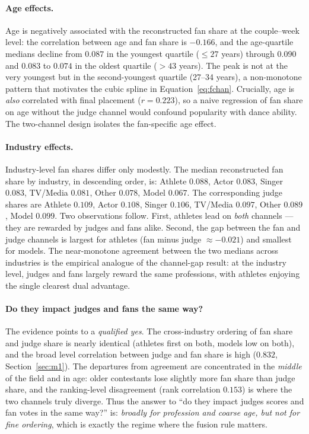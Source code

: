 \documentclass{article}
\begin{document}
\paragraph{Age effects.} Age is negatively associated with the reconstructed fan share at
the couple--week level: the correlation between age and fan share is
$\mathbf{-0.166}$, and the age-quartile medians decline from $0.087$ in the
youngest quartile ($\le27$ years) through $0.090$ and $0.083$ to
$\mathbf{0.074}$ in the oldest quartile ($>43$ years). The peak is not at the very youngest
but in the second-youngest quartile (27--34 years), a non-monotone pattern that motivates
the cubic spline in Equation~\eqref{eq:fchan}. Crucially, age is \emph{also} correlated with
final placement ($r=0.223$), so a naive regression of fan share on age without the judge
channel would confound popularity with dance ability. The two-channel design isolates the
fan-specific age effect.

\paragraph{Industry effects.} Industry-level fan shares differ only modestly. The
median reconstructed fan share by industry, in descending order, is: Athlete $0.088$,
Actor $0.083$, Singer $0.083$, TV/Media $0.081$, Other $0.078$, Model $0.067$. The
corresponding judge shares are Athlete $0.109$, Actor $0.108$, Singer $0.106$, TV/Media
$0.097$, Other $0.089$, Model $0.099$. Two observations follow. First, athletes lead on
\emph{both} channels --- they are rewarded by judges and fans alike. Second, the gap
between the fan and judge channels is largest for athletes (fan minus judge $\approx
-0.021$) and smallest for models. The near-monotone agreement between the two medians across
industries is the empirical analogue of the channel-gap result: at the industry level,
judges and fans largely reward the same professions, with athletes enjoying the single
clearest dual advantage.

\paragraph{Do they impact judges and fans the same way?} The evidence points to a
\emph{qualified yes}. The cross-industry ordering of fan share and judge share is nearly
identical (athletes first on both, models low on both), and the broad level correlation
between judge and fan share is high ($0.832$, Section~\ref{sec:m1}). The departures from
agreement are concentrated in the \emph{middle} of the field and in age: older contestants
lose slightly more fan share than judge share, and the ranking-level disagreement (rank
correlation $0.153$) is where the two channels truly diverge. Thus the answer to ``do they
impact judges scores and fan votes in the same way?'' is: \emph{broadly for profession and
coarse age, but not for fine ordering}, which is exactly the regime where the fusion rule
matters.
\end{document}
